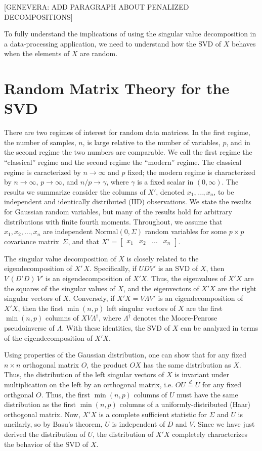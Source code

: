 \documentclass{eoeauth}
\newcommand{\Normal}{\mathrm{Normal }}
\begin{document}
[GENEVERA: ADD PARAGRAPH ABOUT PENALIZED DECOMPOSITIONS]

To fully understand the implications of using the singular value
decomposition in a data-processing application, we need to understand
how the SVD of $X$ behaves when the elements of $X$ are random.


\section{Random Matrix Theory for the SVD}

There are two regimes of interest for random data matrices.  In the
first regime, the number of samples, $n$, is large relative to the number of
variables, $p$, and in the second regime the two numbers are comparable.
We call the first regime the ``classical'' regime and the second
regime the ``modern'' regime.  The classical regime is caracterized by
$n \to \infty$ and $p$ fixed; the modern regime is characterized by $n
\to \infty$, $p \to \infty$, and $n/p \to \gamma$, where $\gamma$ is a
fixed scalar in $(0,\infty)$.  The results we summarize consider the
columns of $X'$, denoted $x_1, \dotsc, x_n$, to be independent and
identically distributed (IID) observations.  We state the results for
Gaussian random variables, but many of the results hold for
arbitrary distributions with finite fourth moments.  Throughout, we
assume that $x_1, x_2, \dotsc, x_n$ are independent $\Normal(0, \Sigma)$ random
variables for some $p \times p$ covariance matrix~$\Sigma$, and that
\(
  X' =
  \begin{bmatrix}
    x_1 & x_2 & \dots & x_n
  \end{bmatrix}.
\)

The singular value decomposition of $X$ is closely related to the
eigendecomposition of $X' \, X$.  Specifically, if $U D V'$ is an SVD
of $X$, then $V \, (D' D) \, V'$ is an eigendecomposition of $X' X$.
Thus, the eigenvalues of $X' X$ are the squares of the singular values
of $X$, and the eigenvectors of $X' X$ are the right singular vectors
of $X$.  Conversely, if $X' X = V \Lambda V'$ is an eigendecomposition of
$X' X$, then the first $\min(n,p)$ left singular vectors of $X$ are the
first $\min(n,p)$ columns of $X V \Lambda^\dagger$, where
$\Lambda^\dagger$ denotes the Moore-Penrose pseudoinverse of $\Lambda$.
With these identities, the SVD of $X$ can be analyzed in terms of the
eigendecomposition of $X' X$.

Using properties of the Gaussian distribution, one
can show that for any fixed $n\times n$ orthogonal matrix $O$, the
product $O X$ has the same distribution as $X$.  Thus, the
distribution of the left singular vectors of $X$ is invariant under
multiplication on the left by an orthogonal matrix, i.e. $O U
\overset{d}{=} U$ for any fixed orthgonal $O$.  Thus, the
first $\min(n,p)$ columns of $U$ must have the same distribution as
the first $\min(n,p)$ columns of a uniformly-distributed (Haar)
orthogonal matrix.  Now, $X' X$ is a complete sufficient statistic
for $\Sigma$ and $U$ is ancilarly, so by Basu's theorem, $U$ is
independent of $D$ and $V$.  Since we have just derived the
distribution of $U$, the distribution of $X' X$ completely
characterizes the behavior of the SVD of $X$.
\end{document}
